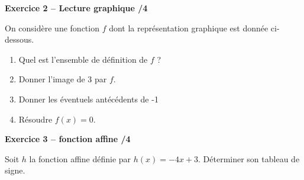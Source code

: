 \documentclass[10pt,a4paper]{article}
\begin{document}
\begin{sujets}
\vspace{0.1cm}

\textbf{Exercice 2 -- Lecture graphique \hfill /4}

On considère une fonction \(f\) dont la représentation graphique est donnée ci-dessous.
\begin{enumerate}
\item Quel est l'ensemble de définition de \(f\) ?
\item Donner l'image de 3 par \(f\).
\item Donner les éventuels antécédents de -1
\item Résoudre \(f(x)=0\).
\end{enumerate}

\begin{center}
\end{center}

\textbf{Exercice 3 -- fonction affine \hfill /4}

Soit \(h\) la fonction affine définie par \(h(x)=-4x+3\). Déterminer son tableau de signe.

\end{sujets}
\end{document}
